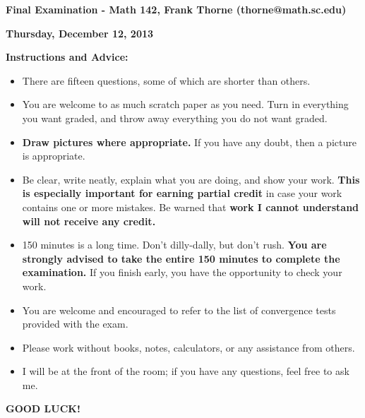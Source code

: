 \documentclass[12pt]{article}
\begin{document}
\setlength{\topmargin}{-2mm}





\begin{center}{\bf Final Examination - Math 142, Frank Thorne (thorne@math.sc.edu)}
\end{center}
\begin{center}
{\bf Thursday, December 12, 2013}
\end{center}

{\bf Instructions and Advice:} 

\begin{itemize}
\item
There are fifteen questions, some of which are shorter than others.
\item
You are welcome to as much scratch paper as you need. Turn in everything you want graded,
and throw away everything you do not want graded.
\item
{\bf Draw pictures where appropriate.} If you have any doubt, then a picture is appropriate.
\item
Be clear, write neatly, explain what you are doing, and show your work. {\bf This is especially
important for earning partial credit} in case your work contains one or more mistakes.
Be warned that {\bf work I cannot understand will not receive any credit.}
\item
150 minutes is a long time. Don't dilly-dally, but don't rush. {\bf You are strongly advised
to take the entire 150 minutes to complete the examination.} If you finish early, you have the
opportunity to check your work.
\item
You are welcome and encouraged to refer to the list of convergence tests provided with the exam.
\item
Please work without books, notes, calculators, or any assistance from others. 
\item
I will be at the front of the room; if you have
any questions, feel free to ask me. 
\end{itemize}

\begin{center}
{\bf GOOD LUCK!}
\end{center}
\newpage
\end{document}
